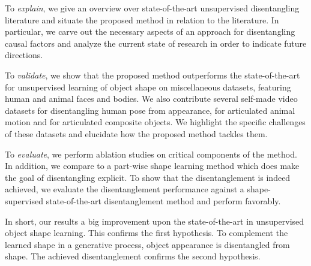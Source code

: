 	To \textit{explain}, we give an overview over state-of-the-art unsupervised disentangling literature and situate the proposed method in relation to the literature. In particular, we carve out the necessary aspects of an approach for disentangling causal factors and analyze the current state of research in order to indicate future directions.


	To \textit{validate}, we show that the proposed method outperforms the state-of-the-art for unsupervised learning of object shape on miscellaneous datasets, featuring human and animal faces and bodies.
	We also contribute several self-made video datasets for disentangling human pose from appearance, for articulated animal motion and for articulated composite objects. We highlight the specific challenges of these datasets and elucidate how the proposed method tackles them.


	To \textit{evaluate}, we perform ablation studies on critical components of the method. In addition, we compare to a part-wise shape learning method which does make the goal of disentangling explicit.
	To show that the disentanglement is indeed achieved, we evaluate the disentanglement performance against a shape-supervised state-of-the-art disentanglement method and perform favorably.


	In short, our results a big improvement upon the state-of-the-art in unsupervised object shape learning. This confirms the first hypothesis. To complement the learned shape in a generative process, object appearance is disentangled from shape. The achieved disentanglement confirms the second hypothesis.
